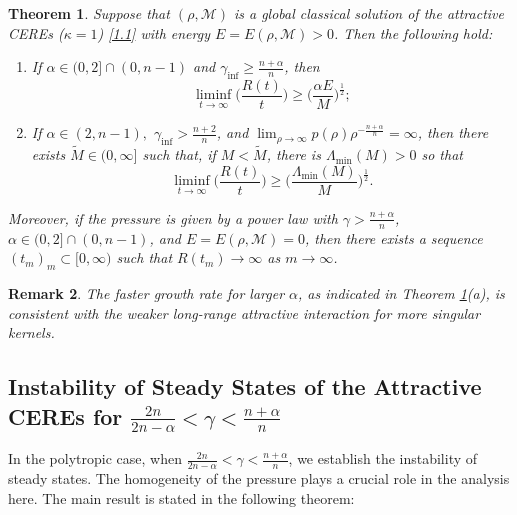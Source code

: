 \documentclass[reqno,11pt]{amsart}
\numberwithin{equation}{section}
\newtheorem{theorem}{Theorem}[section]
\newtheorem{remark}[theorem]{Remark}
\theoremstyle{definition}
\begin{document}
\begin{theorem}\label{growth}
Suppose that $(\rho,\mathcal{M})$ is a global classical solution of 
the attractive CEREs {\rm (}$\kappa = 1${\rm )} \eqref{1.1} with energy $E = E(\rho,\mathcal{M})>0$. 
Then the following hold{\rm :}
 \begin{enumerate}
 \item[{\rm(a)}] If $\alpha\in(0,2]\cap (0,n-1)$ and $\gamma_{\inf} \geq \frac{n + \alpha}{n}$, then
  $$
  \liminf_{t\rightarrow\infty}\Big(\frac{R(t)}{t}\Big)\geq\Big(\frac{\alpha E}{M}\Big)^{\frac{1}{2}};
  $$
 \item[{\rm(b)}] If $\alpha\in(2,n-1),$ $\gamma_{\inf} > \frac{n + 2}{n}$, 
 and $\lim_{\rho\to\infty}p(\rho)\rho^{-\frac{n+\alpha}{n}} = \infty$, then there exists 
 $\tilde{M} \in (0,\infty]$ such that, if $M < \tilde{M}$, 
 there is $\Lambda_{\min}(M) > 0$ so that
 $$
 \liminf_{t\rightarrow\infty}\Big(\frac{R(t)}{t}\Big)
 \geq\Big(\frac{ \Lambda_{\min}(M)}{M}\Big)^{\frac{1}{2}}.
 $$
 \end{enumerate}
 Moreover, if the pressure is given by a power law with 
 $\gamma > \frac{n+\alpha}{n}$, $\alpha\in(0,2]\cap (0,n-1)$, 
 and $E = E(\rho,\mathcal{M})=0$, 
 then there exists a sequence $(t_m)_m \subset [0,\infty)$ 
 such that $R(t_m) \to \infty$ as $m \to \infty$.
 \end{theorem}

 \begin{remark}
 The faster growth rate for larger $\alpha$, 
 as indicated in {\rm Theorem \ref{growth}(a)}, 
 is consistent with the weaker long-range attractive interaction 
 for more singular kernels.
 \end{remark}  


\subsection{Instability of Steady States of the Attractive CEREs for \texorpdfstring{$\frac{2n}{2n - \alpha} < \gamma < \frac{n + \alpha}{n}$}{2n/(2n-\alpha) < \gamma < (n+\alpha)/n}}

In the polytropic case, when  $\frac{2n}{2n-\alpha} < \gamma < \frac{n + \alpha}{n}$, 
we establish the instability of steady states. 
The homogeneity of the pressure plays a crucial
role in the analysis here. The main result is stated in the following theorem:
\end{document}
